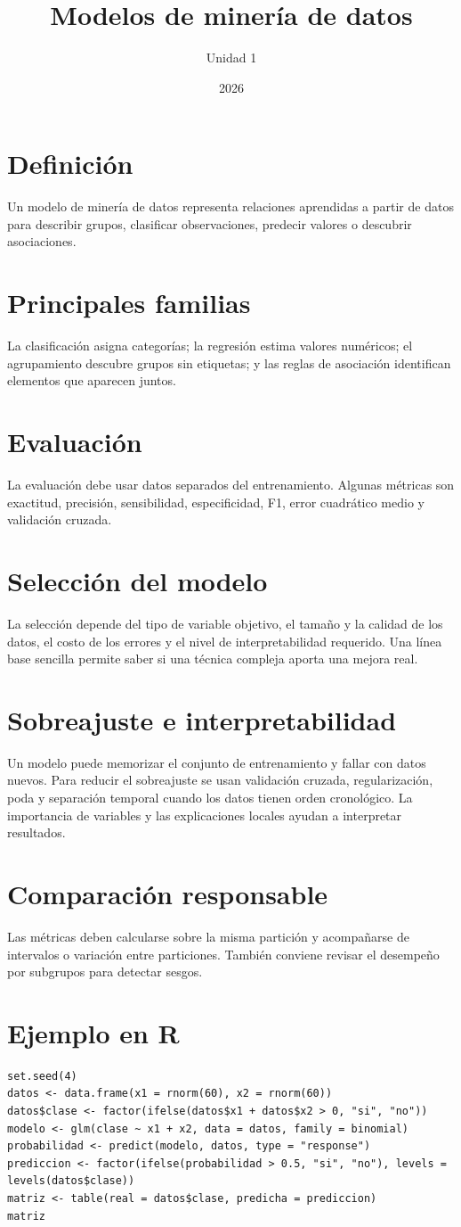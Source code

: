 \documentclass[12pt,a4paper]{article}
\title{Modelos de minería de datos}
\author{Unidad 1}
\date{2026}
\begin{document}
\maketitle
\section{Definición}
Un modelo de minería de datos representa relaciones aprendidas a partir de datos para describir grupos, clasificar observaciones, predecir valores o descubrir asociaciones.
\section{Principales familias}
La clasificación asigna categorías; la regresión estima valores numéricos; el agrupamiento descubre grupos sin etiquetas; y las reglas de asociación identifican elementos que aparecen juntos.
\section{Evaluación}
La evaluación debe usar datos separados del entrenamiento. Algunas métricas son exactitud, precisión, sensibilidad, especificidad, F1, error cuadrático medio y validación cruzada.
\section{Selección del modelo}
La selección depende del tipo de variable objetivo, el tamaño y la calidad de los datos, el costo de los errores y el nivel de interpretabilidad requerido. Una línea base sencilla permite saber si una técnica compleja aporta una mejora real.
\section{Sobreajuste e interpretabilidad}
Un modelo puede memorizar el conjunto de entrenamiento y fallar con datos nuevos. Para reducir el sobreajuste se usan validación cruzada, regularización, poda y separación temporal cuando los datos tienen orden cronológico. La importancia de variables y las explicaciones locales ayudan a interpretar resultados.
\section{Comparación responsable}
Las métricas deben calcularse sobre la misma partición y acompañarse de intervalos o variación entre particiones. También conviene revisar el desempeño por subgrupos para detectar sesgos.
\section{Ejemplo en R}
\begin{lstlisting}
set.seed(4)
datos <- data.frame(x1 = rnorm(60), x2 = rnorm(60))
datos$clase <- factor(ifelse(datos$x1 + datos$x2 > 0, "si", "no"))
modelo <- glm(clase ~ x1 + x2, data = datos, family = binomial)
probabilidad <- predict(modelo, datos, type = "response")
prediccion <- factor(ifelse(probabilidad > 0.5, "si", "no"), levels = levels(datos$clase))
matriz <- table(real = datos$clase, predicha = prediccion)
matriz
\end{lstlisting}
\end{document}
